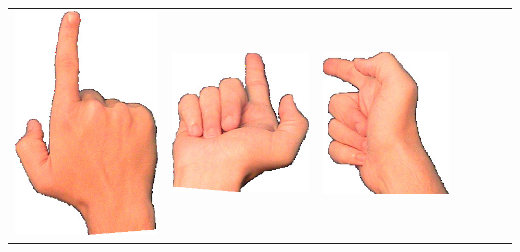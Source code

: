 \documentclass{article}
\begin{document}
\begin{center}
\begin{tabular}{r*{6}{c}}
\includegraphics[scale=0.1]{images/09-04-3.jpg}&
\includegraphics[scale=0.1]{images/09-04-4.jpg}&
\includegraphics[scale=0.1]{images/09-04-5.jpg}&

\end{tabular}
\end{center}
\end{document}
